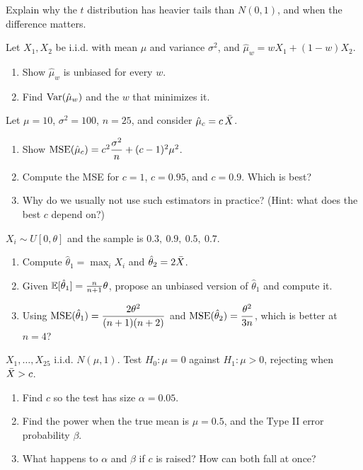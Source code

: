 \documentclass[11pt]{article}
\begin{document}
Explain why the $t$ distribution has heavier tails than $N(0,1)$, and when the difference matters.

Let $X_1,X_2$ be i.i.d. with mean $\mu$ and variance $\sigma^2$, and $\hat\mu_w=wX_1+(1-w)X_2$.
\begin{enumerate}[label=(\alph*)]
  \item Show $\hat\mu_w$ is unbiased for every $w$.
  \item Find $\operatorname{Var}(\hat\mu_w)$ and the $w$ that minimizes it.
\end{enumerate}

Let $\mu=10$, $\sigma^2=100$, $n=25$, and consider $\hat\mu_c=c\,\bar{X}$.
\begin{enumerate}[label=(\alph*)]
  \item Show $\operatorname{MSE}(\hat\mu_c)=c^2\dfrac{\sigma^2}{n}+(c-1)^2\mu^2$.
  \item Compute the MSE for $c=1$, $c=0.95$, and $c=0.9$. Which is best?
  \item Why do we usually not use such estimators in practice? (Hint: what does the best $c$ depend on?)
\end{enumerate}

$X_i\sim U[0,\theta]$ and the sample is $0.3,\ 0.9,\ 0.5,\ 0.7$.
\begin{enumerate}[label=(\alph*)]
  \item Compute $\hat\theta_1=\max_i X_i$ and $\hat\theta_2=2\bar{X}$.
  \item Given $\mathbb{E}[\hat\theta_1]=\tfrac{n}{n+1}\theta$, propose an unbiased version of $\hat\theta_1$ and compute it.
  \item Using $\operatorname{MSE}(\hat\theta_1)=\dfrac{2\theta^2}{(n+1)(n+2)}$ and $\operatorname{MSE}(\hat\theta_2)=\dfrac{\theta^2}{3n}$, which is better at $n=4$?
\end{enumerate}

$X_1,\dots,X_{25}$ i.i.d. $N(\mu,1)$. Test $H_0:\mu=0$ against $H_1:\mu>0$, rejecting when $\bar{X}>c$.
\begin{enumerate}[label=(\alph*)]
  \item Find $c$ so the test has size $\alpha=0.05$.
  \item Find the power when the true mean is $\mu=0.5$, and the Type II error probability $\beta$.
  \item What happens to $\alpha$ and $\beta$ if $c$ is raised? How can both fall at once?
\end{enumerate}
\end{document}
